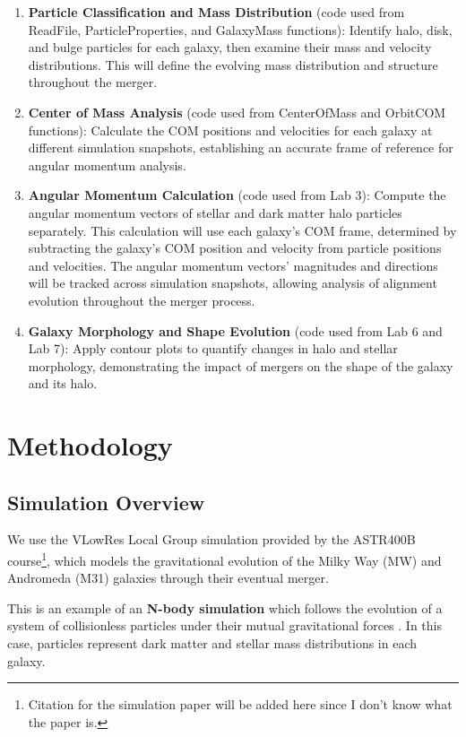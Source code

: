 \documentclass[twocolumn]{aastex631}
\begin{document}
\begin{enumerate}
    \item \textbf{Particle Classification and Mass Distribution} (code used from ReadFile, ParticleProperties, and GalaxyMass functions): Identify halo, disk, and bulge particles for each galaxy, then examine their mass and velocity distributions. This will define the evolving mass distribution and structure throughout the merger.
    
    \item \textbf{Center of Mass Analysis} (code used from CenterOfMass and OrbitCOM functions): Calculate the COM positions and velocities for each galaxy at different simulation snapshots, establishing an accurate frame of reference for angular momentum analysis.

    \item \textbf{Angular Momentum Calculation} (code used from Lab 3): Compute the angular momentum vectors of stellar and dark matter halo particles separately. This calculation will use each galaxy’s COM frame, determined by subtracting the galaxy’s COM position and velocity from particle positions and velocities. The angular momentum vectors' magnitudes and directions will be tracked across simulation snapshots, allowing analysis of alignment evolution throughout the merger process.

    \item \textbf{Galaxy Morphology and Shape Evolution} (code used from Lab 6 and Lab 7): Apply contour plots to quantify changes in halo and stellar morphology, demonstrating the impact of mergers on the shape of the galaxy and its halo.
\end{enumerate}

\section{Methodology}

\subsection{Simulation Overview}

We use the VLowRes Local Group simulation provided by the ASTR400B course\footnote{Citation for the simulation paper will be added here since I don't know what the paper is.}, which models the gravitational evolution of the Milky Way (MW) and Andromeda (M31) galaxies through their eventual merger.


This is an example of an \textbf{N-body simulation} which follows the evolution of a system of collisionless particles under their mutual gravitational forces \citep{Springel2005}. In this case, particles represent dark matter and stellar mass distributions in each galaxy.
\end{document}
